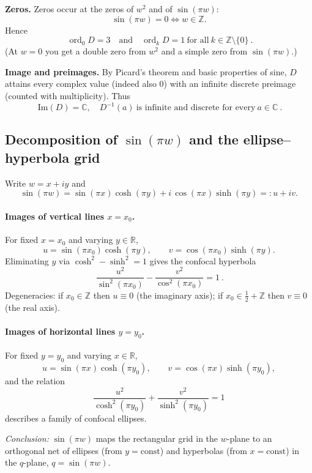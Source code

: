 \documentclass[12pt,a4paper]{article}
\newcommand{\C}{\mathbb{C}}
\begin{document}
\medskip
\textbf{Zeros.} Zeros occur at the zeros of \(w^{2}\) and of \(\sin(\pi w)\):
\[
\sin(\pi w)=0 \iff w\in\mathbb{Z}.
\]
Hence
\[
\boxed{\ \operatorname{ord}_{0}D=3\quad\text{and}\quad \operatorname{ord}_{k}D=1\ \text{for all}\ k\in\mathbb{Z}\setminus\{0\}\ }.
\]
(At \(w=0\) you get a double zero from \(w^{2}\) and a simple zero from \(\sin(\pi w)\).)

\medskip
\textbf{Image and preimages.} By Picard’s theorem and basic properties of sine, \(D\) attains every complex value (indeed also \(0\)) with an infinite discrete preimage (counted with multiplicity). Thus
\[
\boxed{\ \mathrm{Im}(D)=\C,\quad D^{-1}(a)\ \text{is infinite and discrete for every}\ a\in\C\ }.
\]

\subsection*{Decomposition of \(\sin(\pi w)\) and the ellipse--hyperbola grid}

Write \(w=x+iy\) and
\[
\sin(\pi w)=\sin(\pi x)\cosh(\pi y)+i\,\cos(\pi x)\sinh(\pi y)=:u+iv.
\]

\paragraph{Images of vertical lines \(x=x_{0}\).}
For fixed \(x=x_{0}\) and varying \(y\in\mathbb{R}\),
\[
u=\sin(\pi x_{0})\cosh(\pi y),\qquad v=\cos(\pi x_{0})\sinh(\pi y).
\]
Eliminating \(y\) via \(\cosh^{2}-\sinh^{2}=1\) gives the confocal hyperbola
\[
\boxed{\ \frac{u^{2}}{\sin^{2}(\pi x_{0})}-\frac{v^{2}}{\cos^{2}(\pi x_{0})}=1\ }.
\]
Degeneracies: if \(x_{0}\in\mathbb{Z}\) then \(u\equiv0\) (the imaginary axis); if \(x_{0}\in\frac12+\mathbb{Z}\) then \(v\equiv0\) (the real axis).

\paragraph{Images of horizontal lines \(y=y_{0}\).}
For fixed \(y=y_{0}\) and varying \(x\in\mathbb{R}\),
\[
u=\sin(\pi x)\cosh(\pi y_{0}),\qquad v=\cos(\pi x)\sinh(\pi y_{0}),
\]
and the relation
\[
\boxed{\ \frac{u^{2}}{\cosh^{2}(\pi y_{0})}+\frac{v^{2}}{\sinh^{2}(\pi y_{0})}=1\ }
\]
describes a family of confocal ellipses.  

\emph{Conclusion:} \(\sin(\pi w)\) maps the rectangular grid in the \(w\)-plane to an orthogonal net of ellipses (from \(y=\text{const}\)) and hyperbolas (from \(x=\text{const}\)) in the \(q\)-plane, \(q=\sin(\pi w)\).
\end{document}
